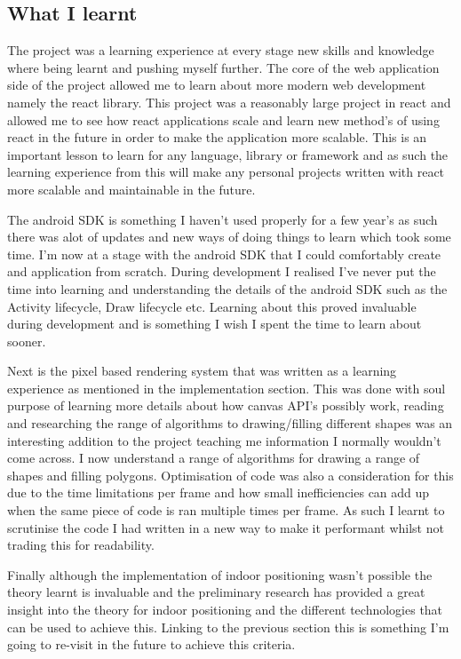 \subsection{What I learnt} %
The project was a learning experience at every stage new skills and knowledge where being learnt and pushing myself further. The core of the web application side of the project allowed me to learn about more modern web development namely the react library. This project was a reasonably large project in react and allowed me to see how react applications scale and learn new method's of using react in the future in order to make the application more scalable. This is an important lesson to learn for any language, library or framework and as such the learning experience from this will make any personal projects written with react more scalable and maintainable in the future.

The android SDK is something I haven't used properly for a few year's as such there was alot of updates and new ways of doing things to learn which took some time. I'm now at a stage with the android SDK that I could comfortably create and application from scratch. During development I realised I've never put the time into learning and understanding the details of the android SDK such as the Activity lifecycle, Draw lifecycle etc. Learning about this proved invaluable during development and is something I wish I spent the time to learn about sooner.

Next is the pixel based rendering system that was written as a learning experience as mentioned in the implementation section. This was done with soul purpose of learning more details about how canvas API's possibly work, reading and researching the range of algorithms to drawing/filling different shapes was an interesting addition to the project teaching me information I normally wouldn't come across. I now understand a range of algorithms for drawing a range of shapes and filling polygons. Optimisation of code was also a consideration for this due to the time limitations per frame and how small inefficiencies can add up when the same piece of code is ran multiple times per frame. As such I learnt to scrutinise the code I had written in a new way to make it performant whilst not trading this for readability.

Finally although the implementation of indoor positioning wasn't possible the theory learnt is invaluable and the preliminary research has provided a great insight into the theory for indoor positioning and the different technologies that can be used to achieve this. Linking to the previous section this is something I'm going to re-visit in the future to achieve this criteria.


